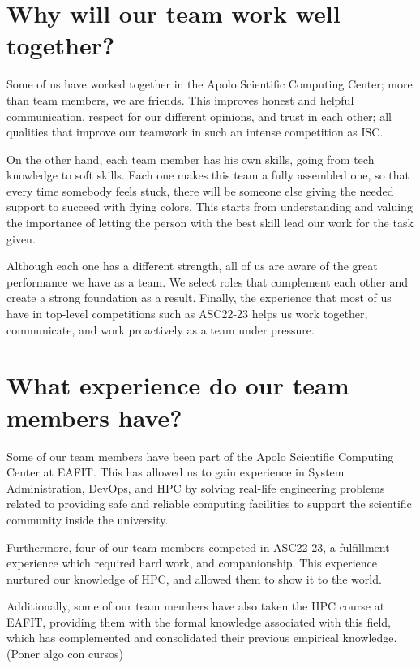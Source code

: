 \documentclass[11pt,a4paper,twocolumn]{article}
\begin{document}
\section{Why will our team work well together?}

Some of us have worked together in the Apolo Scientific Computing Center; more than team members, we are friends. This improves honest and helpful communication, respect for our different opinions, and trust in each other; all qualities that improve our teamwork in such an intense competition as ISC. 

On the other hand, each team member has his own skills, going from tech knowledge to soft skills. Each one makes this team a fully assembled one, so that every time somebody feels stuck, there will be someone else giving the needed support to succeed with flying colors. This starts from understanding and valuing the importance of letting the person with the best skill lead our work for the task given.

Although each one has a different strength, all of us are aware of the great performance we have as a team. We select roles that complement each other and create a strong foundation as a result. Finally, the experience that most of us have in top-level competitions such as ASC22-23 helps us work together, communicate, and work proactively as a team under pressure.

\section{What experience do our team members have?}

Some of our team members have been part of the Apolo Scientific Computing Center at EAFIT. This has allowed us to gain experience in System Administration, DevOps, and HPC by solving real-life engineering problems related to providing safe and reliable computing facilities to support the scientific community inside the university. 

Furthermore, four of our team members competed in ASC22-23, a fulfillment experience which required hard work, and companionship. This experience nurtured our knowledge of HPC, and allowed them to show it to the world.

Additionally, some of our team members have also taken the HPC course at EAFIT, providing them with the formal knowledge associated with this field, which has complemented and consolidated their previous empirical knowledge. (Poner algo con cursos)
\end{document}
